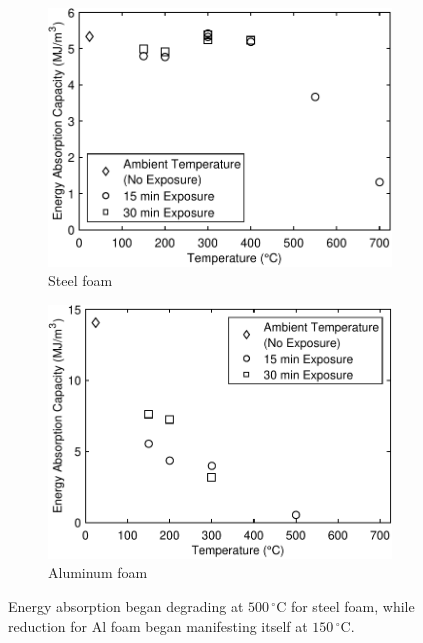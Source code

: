 \documentclass[review]{elsarticle}
\begin{document}
{\begin{figure}
	\centering
	\begin{subfigure}{0.50\textwidth}
		\centering
		\includegraphics[width=0.90\linewidth]
		{Tex-Figures/Fig21a-EnergyCapacity-Fe.pdf}
		\caption{Steel foam}
		\label{fig:energyCapacity_Steel}
	\end{subfigure}%
	\begin{subfigure}{0.50\textwidth}
		\centering
		\includegraphics[width=0.90\linewidth]
		{Tex-Figures/Fig21b-EnergyCapacity-Al.pdf}
		\caption{Aluminum foam}
		\label{fig:energyCapacity_Al}
	\end{subfigure}
	\caption{ Energy absorption began degrading at  $500\,^{\circ}\mathrm{C}$ for steel foam, while reduction for Al foam began manifesting itself at $150\,^{\circ}\mathrm{C}$.}
	\label{fig:energyCapacity}
\end{figure}

}
\end{document}
